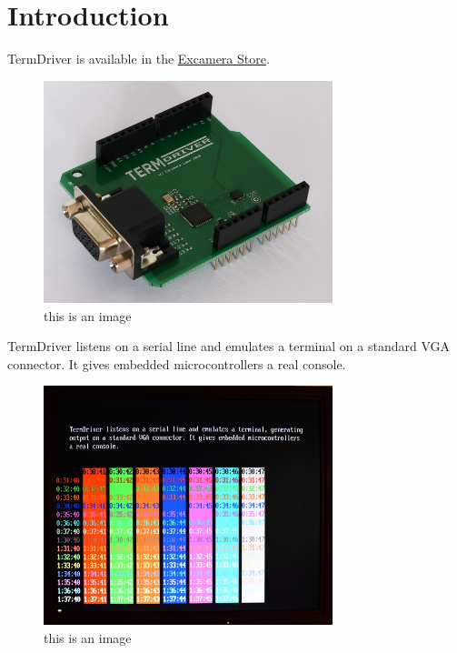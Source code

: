 \documentclass{article}
\begin{document}
\listoffigures
\listoftables
\tableofcontents

\section{Introduction\label{introduction}}

\leavevmode\hypertarget{termdriver}{}%
TermDriver is available in the
\href{http://excamera.com/sphinx/gameduino/store.html}{Excamera Store}.

\begin{figure}[H]
  \centering
  \caption{this is an image}
  \includegraphics[width=0.75\textwidth]{img/img1}
\end{figure}

TermDriver listens on a serial line and emulates a terminal on a
standard VGA connector. It gives embedded microcontrollers a real
console.

\begin{figure}[H]
  \centering
  \caption{this is an image}
  \includegraphics[width=0.75\textwidth]{img/img2}
\end{figure}
\end{document}
